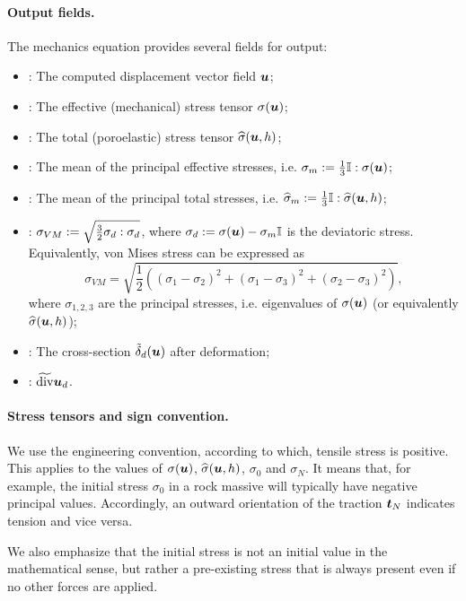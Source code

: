 \paragraph{Output fields.}
The mechanics equation provides several fields for output:
\begin{itemize}
    \item {}: The computed displacement vector field $\mathbf{\boldsymbol{u}}$;
    \item {}: The effective (mechanical) stress tensor $\sigma(\mathbf{\boldsymbol{u}})$;
    \item {}: The total (poroelastic) stress tensor $\widehat\sigma(\mathbf{\boldsymbol{u}},h)$;
    \item {}: The mean of the principal effective stresses, i.e. $\sigma_m:=\frac13{\mathbb{I}}:{\mathbb{\sigma}}(\mathbf{\boldsymbol{u}})$;
    \item {}: The mean of the principal total stresses, i.e. $\widehat\sigma_m:=\frac13{\mathbb{I}}:\widehat\sigma(\mathbf{\boldsymbol{u}},h)$;
    \item {}: $\sigma_{VM}:=\sqrt{\frac32{\mathbb{\sigma}}_d:{\mathbb{\sigma}}_d}$, where ${\mathbb{\sigma}}_d:={\mathbb{\sigma}}(\mathbf{\boldsymbol{u}})-\sigma_m{\mathbb{I}}$ is the deviatoric stress.
    Equivalently, von Mises stress can be expressed as
    \[ \sigma_{VM} = \sqrt{\frac12\left((\sigma_1-\sigma_2)^2+(\sigma_1-\sigma_3)^2+(\sigma_2-\sigma_3)^2\right)}, \]
    where $\sigma_{1,2,3}$ are the principal stresses, i.e. eigenvalues of ${\mathbb{\sigma}}(\mathbf{\boldsymbol{u}})$ (or equivalently $\widehat\sigma(\mathbf{\boldsymbol{u}},h)$);
    \item {}: The cross-section $\tilde\delta_d(\mathbf{\boldsymbol{u}})$ after deformation;
    \item {}: $\widetilde{\operatorname{div}}\mathbf{\boldsymbol{u}}_d$.
\end{itemize}


\paragraph{Stress tensors and sign convention.}
We use the engineering convention, according to which, tensile stress is positive.
This applies to the values of $\sigma(\mathbf{\boldsymbol{u}})$, $\widehat\sigma(\mathbf{\boldsymbol{u}},h)$, $\sigma_0$ and $\sigma_N$.
It means that, for example, the initial stress $\sigma_0$ in a rock massive will typically have negative principal values.
Accordingly, an outward orientation of the traction $\mathbf{\boldsymbol{t}}_N$ indicates tension and vice versa.

We also emphasize that the initial stress is not an initial value in the mathematical sense, but rather a pre-existing stress that is always present even if no other forces are applied.